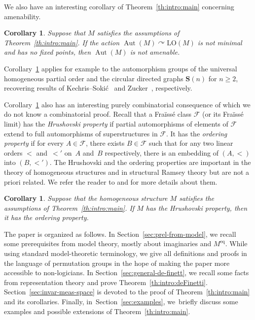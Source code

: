 \documentclass[JEP,XML,SOM,Unicode,published]{cedram}
\let\mathcal\mathscr
\let\actson\curvearrowright
\theoremstyle{plain}
\newtheorem{cor}[theorem]{Corollary}
\theoremstyle{definition}
\newcommand{\bS}{{\mathbf S}}
\newcommand{\cF}{\mathcal{F}}
\DeclareMathOperator{\Aut}{Aut}
\newcommand{\LO}{\mathrm{LO}}
\newcommand{\eq}{^{\mathrm{eq}}}
\begin{document}
We also have an interesting corollary of Theorem~\ref{th:intro:main} concerning amenability.
\begin{cor}
\label{c:intro:amenability}
Suppose that $M$ satisfies the assumptions of Theorem~\ref{th:intro:main}. If the action $\Aut(M) \actson \LO(M)$ is not minimal and has no fixed points, then $\Aut(M)$ is not amenable.
\end{cor}

Corollary~\ref{c:intro:amenability} applies for example to the automorphism groups of the universal homogeneous partial order and the circular directed graphs $\bS(n)$ for $n \geq 2$, recovering results of Kechris--Soki\'c~\cite{Kechris2012} and Zucker~\cite{Zucker2014}, respectively.

Corollary~\ref{c:intro:amenability} also has an interesting purely combinatorial consequence of which we do not know a combinatorial proof. Recall that a Fraïssé class $\cF$ (or its Fraïssé limit) has the \emph{Hrushovski property} if partial automorphisms of elements of $\cF$ extend to full automorphisms of superstructures in $\cF$. It has the \emph{ordering property} if for every $A \in \cF$, there exists $B \in \cF$ such that for any two linear orders $<$ and~$<'$ on~$A$ and~$B$ respectively, there is an embedding of $(A, <)$ into $(B, <')$. The Hrushovski and the ordering properties are important in the theory of homogeneous structures and in structural Ramsey theory but are not a priori related. We refer the reader to \cite{Kechris2007a} and \cite{Nesetril1978} for more details about them.
\begin{cor}
\label{c:intro:Hrushovski}
Suppose that the homogeneous structure $M$ satisfies the assumptions of Theorem~\ref{th:intro:main}. If $M$ has the Hrushovski property, then it has the ordering property.
\end{cor}

The paper is organized as follows. In Section~\ref{sec:prel-from-model}, we recall some prerequisites from model theory, mostly about imaginaries and $M\eq$. While using standard model-theoretic terminology, we give all definitions and proofs in the language of permutation groups in the hope of making the paper more accessible to non-logicians. In Section~\ref{sec:general-de-finett}, we recall some facts from representation theory and prove Theorem~\ref{th:intro:deFinetti}. Section~\ref{sec:invar-meas-space} is devoted to the proof of Theorem~\ref{th:intro:main} and its corollaries. Finally, in~Section~\ref{sec:examples}, we~briefly discuss some examples and possible extensions of Theorem~\ref{th:intro:main}.
\end{document}
